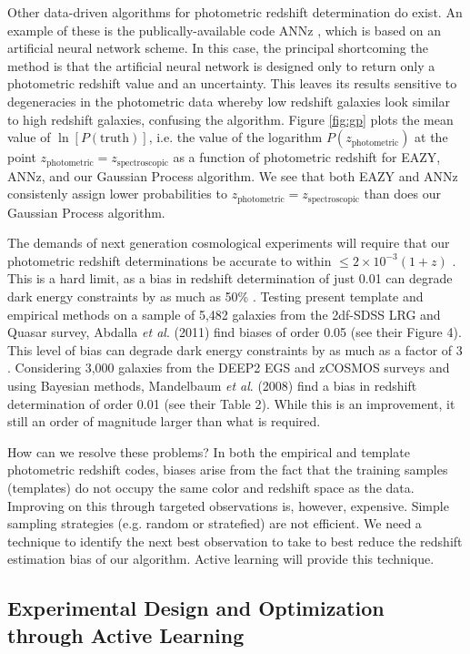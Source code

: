 \documentclass[useAMS,usenatbib,tightenlines,11pt,preprint]{aastex}
\begin{document}
Other data-driven algorithms for photometric redshift determination do exist. 
An example of these is the publically-available code ANNz \cite{annz},
which is based on an artificial neural network scheme.
In this case, the principal
shortcoming the method is that the artificial neural network
is designed only to return only a
photometric redshift value and an uncertainty.  This leaves its results
sensitive to degeneracies in the photometric data whereby low redshift galaxies
look similar to high redshift galaxies, confusing the algorithm. 
Figure \ref{fig:gp} plots the mean value of $\ln[P(\text{truth})]$,
i.e. the value of the logarithm $P(z_\text{photometric})$ at the point
$z_\text{photometric}=z_\text{spectroscopic}$ 
as a function
of photometric redshift for EAZY, ANNz, and our Gaussian Process algorithm.
We see that both EAZY and ANNz consistenly assign lower probabilities to
$z_\text{photometric}=z_\text{spectroscopic}$ than does our Gaussian Process algorithm.

The demands of next generation cosmological experiments will require
that our photometric redshift determinations be accurate to within
$\le 2\times 10^{-3}(1+z)$ \cite{desc}.  This is a hard limit, as a
bias in redshift determination of just 0.01 can degrade dark energy
constraints by as much as 50\%
\cite{kitching,huterer2006,nakajima2011}.  Testing present template
and empirical methods on a sample of 5,482 galaxies from the 2df-SDSS
LRG and Quasar survey, Abdalla {\it et al}. (2011) find biases of
order 0.05 (see their Figure 4).  This level of bias can degrade dark
energy constraints by as much as a factor of 3 \cite{Ma2006}.
Considering 3,000 galaxies from the DEEP2 EGS and zCOSMOS surveys and
using Bayesian methods, Mandelbaum {\it et al}.  (2008) find a bias in
redshift determination of order 0.01 (see their Table 2).  While this
is an improvement, it still an order of magnitude larger than what is
required.

How can we resolve these problems?  In both the empirical and template
photometric redshift codes, biases arise from the fact that the
training samples (templates) do not occupy the same color and redshift
space as the data.  Improving on this through targeted observations
is, however, expensive.  Simple sampling strategies (e.g. random or
stratefied) are not efficient.  We need a technique to identify the
next best observation to take to best reduce the redshift estimation
bias of our algorithm.  Active learning will provide this technique.


\subsection{Experimental Design and Optimization through Active
  Learning}
 
\end{document}
